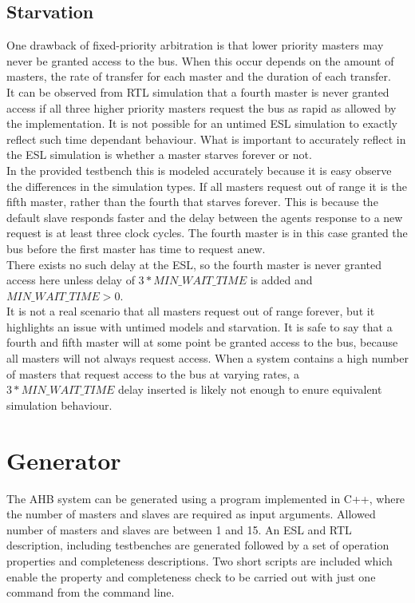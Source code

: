\subsection{Starvation}
One drawback of fixed-priority arbitration is that lower priority masters may never be granted access to the bus. When this occur depends on the amount of masters, the rate of transfer for each master and the duration of each transfer. \\
It can be observed from RTL simulation that a fourth master is never granted access if all three higher priority masters request the bus as rapid as allowed by
the implementation. It is not possible for an untimed ESL simulation to exactly reflect such time dependant behaviour. What is important to accurately reflect in the ESL simulation is whether a master starves forever or not. \\
In the provided testbench this is modeled accurately because it is easy observe the differences in the simulation types. If all masters request out of range it is the fifth master, rather than the fourth that starves forever. This is because the default slave responds faster and the delay between the agents response to a new request is at least three clock cycles. The fourth master is in this case granted the bus before the first master has time to request anew. \\
There exists no such delay at the ESL, so the fourth master is never granted access here unless delay of $3*MIN\_WAIT\_TIME$ is added and $MIN\_WAIT\_TIME>0$. \\
It is not a real scenario that all masters request out of range forever, but it highlights an issue with untimed models and starvation. It is safe to say that a fourth and fifth master will at some point be granted access to the bus, because all masters will not always request access. When a system contains a high number of masters that request access to the bus at varying rates, a $3*MIN\_WAIT\_TIME$ delay inserted is likely not enough to enure equivalent simulation behaviour. 

\section{Generator}
\label{sec:generator}
The AHB system can be generated using a program implemented in C++, where the number of masters and slaves are required as input arguments. Allowed number of
masters and slaves are between 1 and 15. An ESL and RTL description, including testbenches are generated followed by a set of operation properties and completeness descriptions. Two short scripts are included which enable the property and completeness check to be carried out with just one command from the
command line. 

